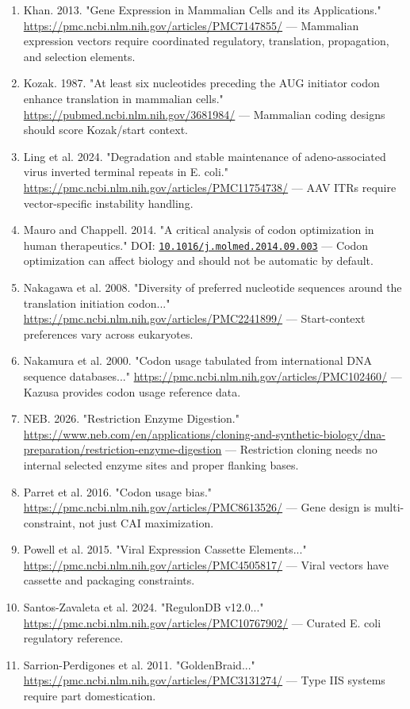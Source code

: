 \documentclass[11pt]{report}
\begin{document}
\begin{enumerate}
\item Khan. 2013. "Gene Expression in Mammalian Cells and its Applications." \url{https://pmc.ncbi.nlm.nih.gov/articles/PMC7147855/} — Mammalian expression vectors require coordinated regulatory, translation, propagation, and selection elements.
\item Kozak. 1987. "At least six nucleotides preceding the AUG initiator codon enhance translation in mammalian cells." \url{https://pubmed.ncbi.nlm.nih.gov/3681984/} — Mammalian coding designs should score Kozak/start context.
\item Ling et al. 2024. "Degradation and stable maintenance of adeno-associated virus inverted terminal repeats in E. coli." \url{https://pmc.ncbi.nlm.nih.gov/articles/PMC11754738/} — AAV ITRs require vector-specific instability handling.
\item Mauro and Chappell. 2014. "A critical analysis of codon optimization in human therapeutics." DOI: \href{https://doi.org/10.1016/j.molmed.2014.09.003}{\nolinkurl{10.1016/j.molmed.2014.09.003}} — Codon optimization can affect biology and should not be automatic by default.
\item Nakagawa et al. 2008. "Diversity of preferred nucleotide sequences around the translation initiation codon..." \url{https://pmc.ncbi.nlm.nih.gov/articles/PMC2241899/} — Start-context preferences vary across eukaryotes.
\item Nakamura et al. 2000. "Codon usage tabulated from international DNA sequence databases..." \url{https://pmc.ncbi.nlm.nih.gov/articles/PMC102460/} — Kazusa provides codon usage reference data.
\item NEB. 2026. "Restriction Enzyme Digestion." \url{https://www.neb.com/en/applications/cloning-and-synthetic-biology/dna-preparation/restriction-enzyme-digestion} — Restriction cloning needs no internal selected enzyme sites and proper flanking bases.
\item Parret et al. 2016. "Codon usage bias." \url{https://pmc.ncbi.nlm.nih.gov/articles/PMC8613526/} — Gene design is multi-constraint, not just CAI maximization.
\item Powell et al. 2015. "Viral Expression Cassette Elements..." \url{https://pmc.ncbi.nlm.nih.gov/articles/PMC4505817/} — Viral vectors have cassette and packaging constraints.
\item Santos-Zavaleta et al. 2024. "RegulonDB v12.0..." \url{https://pmc.ncbi.nlm.nih.gov/articles/PMC10767902/} — Curated E. coli regulatory reference.
\item Sarrion-Perdigones et al. 2011. "GoldenBraid..." \url{https://pmc.ncbi.nlm.nih.gov/articles/PMC3131274/} — Type IIS systems require part domestication.

\end{enumerate}
\end{document}
